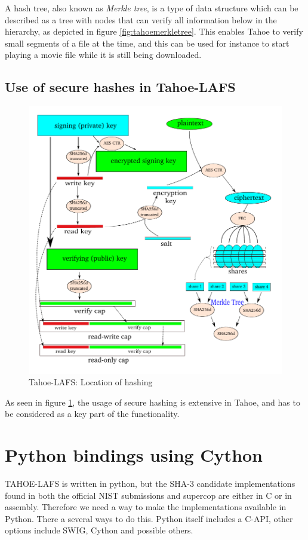\documentclass[english,12pt,a4paper]{book}
\begin{document}
A hash tree, also known as \emph{Merkle tree}, is a type of data structure
which can be described as a tree with nodes that can verify all information
below in the hierarchy, as depicted in figure \ref{fig:tahoemerkletree}. This
enables Tahoe to verify small segments of a file at the time, and this can be
used for instance to start playing a movie file while it is still being
downloaded.


\subsection{Use of secure hashes in Tahoe-LAFS}

\begin{figure}[h]
    \centering
    \includegraphics[width=0.9\columnwidth]{Tahoe-hashing.pdf}
    \caption{Tahoe-LAFS: Location of hashing}
    \label{fig:tahoehashing}
\end{figure}

As seen in figure \ref{fig:tahoehashing}, the usage of secure hashing is
extensive in Tahoe, and has to be considered as a key part of the functionality.


\section{Python bindings using Cython}
TAHOE-LAFS is written in python, but the SHA-3 candidate implementations found
in both the official NIST submissions and supercop are either in C or in
assembly. Therefore we need a way to make the implementations available in
Python. There a several ways to do this. Python itself includes a C-API,  
other options include SWIG, Cython and possible others.
\end{document}
